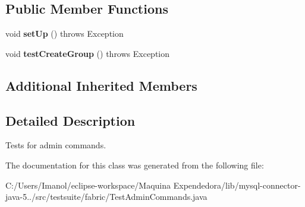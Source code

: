 \subsection*{Public Member Functions}
\begin{DoxyCompactItemize}
\item 
\mbox{\label{classtestsuite_1_1fabric_1_1_test_admin_commands_ad4feb6b5b045e4c9239f284c9139941c}} 
void {\bfseries set\+Up} ()  throws Exception 
\item 
\mbox{\label{classtestsuite_1_1fabric_1_1_test_admin_commands_a63d5a06d5b8a47eb0de80b9f5f713dba}} 
void {\bfseries test\+Create\+Group} ()  throws Exception 
\end{DoxyCompactItemize}
\subsection*{Additional Inherited Members}


\subsection{Detailed Description}
Tests for admin commands. 

The documentation for this class was generated from the following file\+:\begin{DoxyCompactItemize}
\item 
C\+:/\+Users/\+Imanol/eclipse-\/workspace/\+Maquina Expendedora/lib/mysql-\/connector-\/java-\/5../src/testsuite/fabric/Test\+Admin\+Commands.\+java\end{DoxyCompactItemize}
